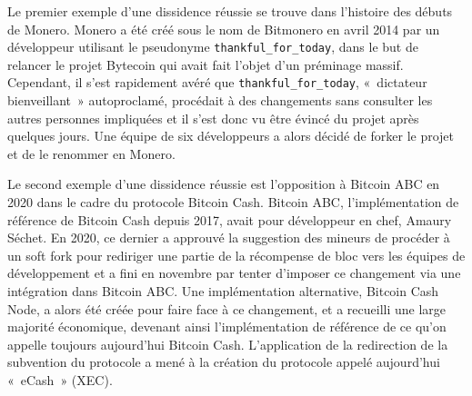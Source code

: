 Le premier exemple d'une dissidence réussie se trouve dans l'histoire des débuts de Monero. Monero a été créé sous le nom de Bitmonero en avril 2014 par un développeur utilisant le pseudonyme \texttt{thankful\_for\_today}, dans le but de relancer le projet Bytecoin qui avait fait l'objet d'un préminage massif. Cependant, il s'est rapidement avéré que \texttt{thankful\_for\_today}, «~dictateur bienveillant~» autoproclamé, procédait à des changements sans consulter les autres personnes impliquées et il s'est donc vu être évincé du projet après quelques jours. Une équipe de six développeurs a alors décidé de forker le projet et de le renommer en Monero.

Le second exemple d'une dissidence réussie est l'opposition à Bitcoin ABC en 2020 dans le cadre du protocole Bitcoin Cash. Bitcoin ABC, l'implémentation de référence de Bitcoin Cash depuis 2017, avait pour développeur en chef, Amaury Séchet. En 2020, ce dernier a approuvé la suggestion des mineurs de procéder à un soft fork pour rediriger une partie de la récompense de bloc vers les équipes de développement et a fini en novembre par tenter d'imposer ce changement via une intégration dans Bitcoin ABC. Une implémentation alternative, Bitcoin Cash Node, a alors été créée pour faire face à ce changement, et a recueilli une large majorité économique, devenant ainsi l'implémentation de référence de ce qu'on appelle toujours aujourd'hui Bitcoin Cash. L'application de la redirection de la subvention du protocole a mené à la création du protocole appelé aujourd'hui «~eCash~» (XEC).

